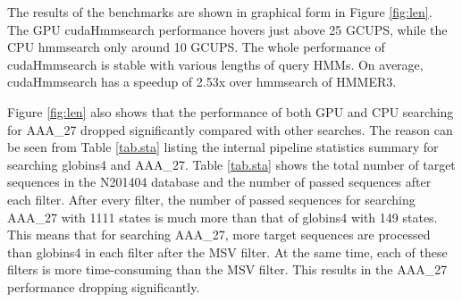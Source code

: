 The results of the benchmarks are shown in graphical form in Figure \ref{fig:len}. The GPU cudaHmmsearch performance hovers just above 25 GCUPS, while the CPU hmmsearch only around 10 GCUPS. The whole performance of cudaHmmsearch is stable with various lengths of query HMMs. On average, cudaHmmsearch has a speedup of 2.53x over hmmsearch of HMMER3. 

Figure \ref{fig:len} also shows that the performance of both GPU and CPU searching for AAA\_27 dropped significantly compared with other searches. The reason can be seen from Table \ref{tab.sta} listing the internal pipeline statistics summary for searching globins4 and AAA\_27. Table \ref{tab.sta} shows the total number of target sequences in the N201404 database and the number of passed sequences after each filter. After every filter, the number of passed sequences for searching AAA\_27 with 1111 states is much more than that of globins4 with 149 states. This means that for searching AAA\_27, more target sequences are processed than globins4 in each filter after the MSV filter. At the same time, each of these filters is more time-consuming than the MSV filter. This results in the AAA\_27 performance dropping significantly.

